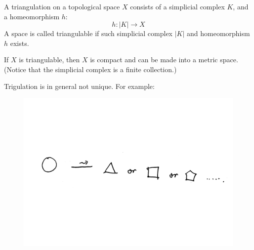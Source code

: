 \begin{defi}
    A triangulation on a topological space $X$ consists of a
    simplicial complex $K$, and a homeomorphism $h$:
    $$ h:|K|\to X$$
    A space is called triangulable if such simplicial complex $|K|$
    and homeomorphism $h$ exists.
\end{defi}
\begin{fact}
    If $X$ is triangulable, then $X$ is compact and can be made into a
    metric space. (Notice that the simplicial complex is a finite
    collection.)
\end{fact}
\begin{remark}
    Trigulation is in general not unique. For example:
    \begin{figure}[H]
        \centering
        \includegraphics[width=0.6\linewidth]{pics/ch6-scanned-notes-1/rmk2}
    \end{figure}
\end{remark}
